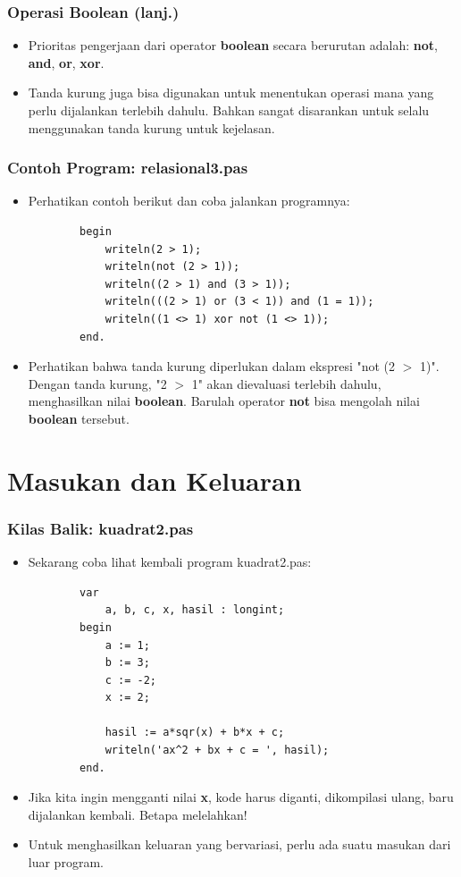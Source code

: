 \documentclass{beamer}
\begin{document}
\begin{frame}
\frametitle{Operasi Boolean (lanj.)}
\begin{itemize}
    \item Prioritas pengerjaan dari operator \textbf{boolean} secara berurutan adalah: \textbf{not}, \textbf{and}, \textbf{or}, \textbf{xor}.
    \item Tanda kurung juga bisa digunakan untuk menentukan operasi mana yang perlu dijalankan terlebih dahulu. Bahkan sangat disarankan untuk selalu menggunakan tanda kurung untuk kejelasan.
\end{itemize}
\end{frame}

\begin{frame}[fragile]
\frametitle{Contoh Program: relasional3.pas}
\begin{itemize}
    \item Perhatikan contoh berikut dan coba jalankan programnya:
    \begin{lstlisting}
        begin
            writeln(2 > 1);
            writeln(not (2 > 1));
            writeln((2 > 1) and (3 > 1));
            writeln(((2 > 1) or (3 < 1)) and (1 = 1));
            writeln((1 <> 1) xor not (1 <> 1));
        end.
    \end{lstlisting}
    \item Perhatikan bahwa tanda kurung diperlukan dalam ekspresi "not (2 $>$ 1)". Dengan tanda kurung, "2 $>$ 1" akan dievaluasi terlebih dahulu, menghasilkan nilai \textbf{boolean}. Barulah operator \textbf{not} bisa mengolah nilai \textbf{boolean} tersebut.
\end{itemize}
\end{frame}

\section{Masukan dan Keluaran}
\frame{\sectionpage}

\begin{frame}[fragile]
\frametitle{Kilas Balik: kuadrat2.pas}
\begin{itemize}
    \item Sekarang coba lihat kembali program kuadrat2.pas:
    \begin{lstlisting}
        var
            a, b, c, x, hasil : longint;
        begin
            a := 1;
            b := 3;
            c := -2;
            x := 2;

            hasil := a*sqr(x) + b*x + c;
            writeln('ax^2 + bx + c = ', hasil);
        end.
    \end{lstlisting}
    \item Jika kita ingin mengganti nilai \textbf{x}, kode harus diganti, dikompilasi ulang, baru dijalankan kembali. Betapa melelahkan!
    \item Untuk menghasilkan keluaran yang bervariasi, perlu ada \newline suatu masukan dari luar program.
\end{itemize}
\end{frame}
\end{document}
